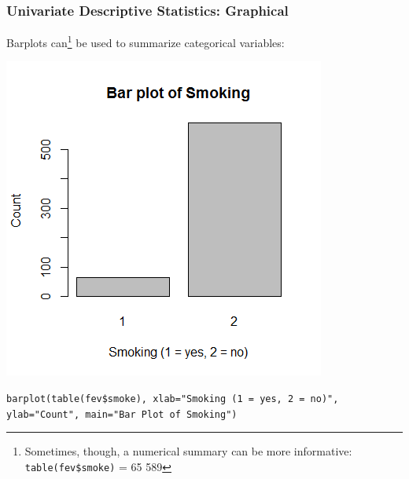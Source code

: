 \documentclass[12pt, 
hyperref={colorlinks=true, linkcolor=blue, urlcolor=cyan}]{beamer}
\begin{document}
\begin{frame}
\frametitle{Univariate Descriptive Statistics: Graphical}

Barplots can\footnote[frame]{Sometimes, though, a numerical summary can be more informative: \\ \hfill \texttt{table(fev\$smoke)} = 65 589} be used to summarize categorical variables: \vspace{-0.8cm} %

\center \includegraphics[height=0.6\textheight]{./barplot-smoke}

\vspace{-0.5cm} \begin{scriptsize} \texttt{barplot(table(fev\$smoke), xlab="Smoking (1 = yes, 2 = no)", ylab="Count", main="Bar Plot of Smoking")\\} \end{scriptsize}
\end{frame}
\end{document}
